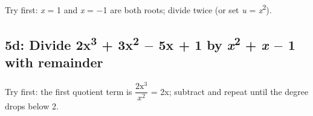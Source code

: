 \documentclass[11pt]{article}
\begin{document}
\begin{keepsection}
\begin{keepsection}
Try first: \textit{x} = 1 and \textit{x} = \ensuremath{-}1 are both roots; divide twice (or set \textit{u} = \textit{x}\textsuperscript{2}).

\end{keepsection}

\begin{keepsection}
\subsection{5d: Divide 2x\textsuperscript{3} + 3x\textsuperscript{2} \ensuremath{-} 5x + 1 by \textit{x}\textsuperscript{2} + \textit{x} \ensuremath{-} 1 with remainder}

Try first: the first quotient term is {\small\ensuremath{\dfrac{2\mathrm{x}^{3}}{{x}^{2}}}} = 2x; subtract and repeat until the degree drops below 2.

\end{keepsection}
\end{keepsection}
\end{document}
